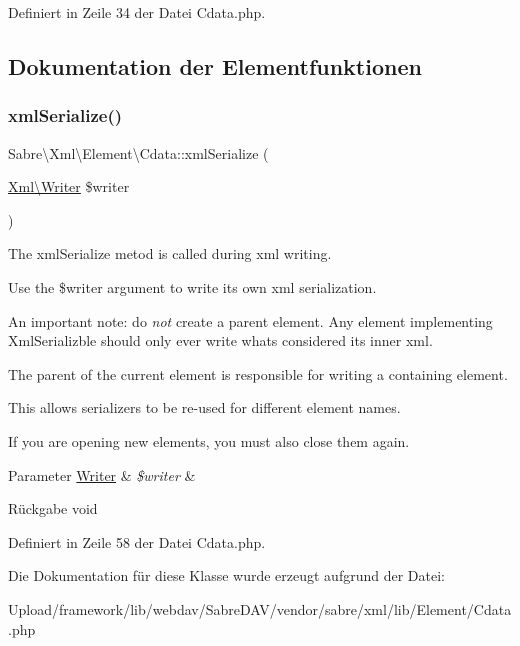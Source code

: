 Definiert in Zeile 34 der Datei Cdata.\+php.



\subsection{Dokumentation der Elementfunktionen}
\mbox{\label{class_sabre_1_1_xml_1_1_element_1_1_cdata_ad0130ea08e4557560fb82b5ad3e556e9}} 
\subsubsection{\texorpdfstring{xml\+Serialize()}{xmlSerialize()}}
{\footnotesize\ttfamily Sabre\textbackslash{}\+Xml\textbackslash{}\+Element\textbackslash{}\+Cdata\+::xml\+Serialize (\begin{DoxyParamCaption}\item[{\mbox{\hyperlink{class_sabre_1_1_xml_1_1_writer}{Xml\textbackslash{}\+Writer}}}]{\$writer }\end{DoxyParamCaption})}

The xml\+Serialize metod is called during xml writing.

Use the \$writer argument to write its own xml serialization.

An important note\+: do {\itshape not} create a parent element. Any element implementing Xml\+Serializble should only ever write what\textquotesingle{}s considered its \textquotesingle{}inner xml\textquotesingle{}.

The parent of the current element is responsible for writing a containing element.

This allows serializers to be re-\/used for different element names.

If you are opening new elements, you must also close them again.


\begin{DoxyParams}[1]{Parameter}
\mbox{\hyperlink{class_sabre_1_1_xml_1_1_writer}{Writer}} & {\em \$writer} & \\
\hline
\end{DoxyParams}
\begin{DoxyReturn}{Rückgabe}
void 
\end{DoxyReturn}


Definiert in Zeile 58 der Datei Cdata.\+php.



Die Dokumentation für diese Klasse wurde erzeugt aufgrund der Datei\+:\begin{DoxyCompactItemize}
\item 
Upload/framework/lib/webdav/\+Sabre\+D\+A\+V/vendor/sabre/xml/lib/\+Element/Cdata.\+php\end{DoxyCompactItemize}

